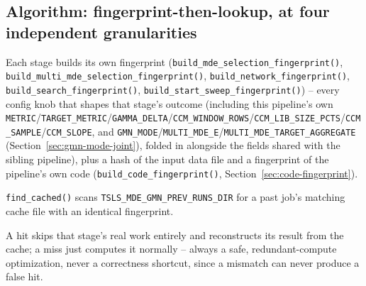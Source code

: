 \documentclass[11pt]{article}
\begin{document}
\subsection{Algorithm: fingerprint-then-lookup, at four independent granularities}
\begin{steps}
\item Each stage builds its own fingerprint (\texttt{build\_mde\_selection\_fingerprint()}, \texttt{build\_multi\_mde\_selection\_fingerprint()}, \texttt{build\_network\_fingerprint()}, \texttt{build\_search\_fingerprint()}, \texttt{build\_start\_sweep\_fingerprint()}) -- every config knob that shapes that stage's outcome (including this pipeline's own \texttt{METRIC}/\texttt{TARGET\_METRIC}/\texttt{GAMMA\_DELTA}/\texttt{CCM\_WINDOW\_ROWS}/\texttt{CCM\_LIB\_SIZE\_PCTS}/\texttt{CCM\_SAMPLE}/\texttt{CCM\_SLOPE}, and \texttt{GMN\_MODE}/\texttt{MULTI\_MDE\_E}/\texttt{MULTI\_MDE\_TARGET\_AGGREGATE} (Section~\ref{sec:gmn-mode-joint}), folded in alongside the fields shared with the sibling pipeline), plus a hash of the input data file and a fingerprint of the pipeline's own code (\texttt{build\_code\_fingerprint()}, Section~\ref{sec:code-fingerprint}).
\item \texttt{find\_cached()} scans \texttt{TSLS\_MDE\_GMN\_PREV\_RUNS\_DIR} for a past job's matching cache file with an identical fingerprint.
\item A hit skips that stage's real work entirely and reconstructs its result from the cache; a miss just computes it normally -- always a safe, redundant-compute optimization, never a correctness shortcut, since a mismatch can never produce a false hit.
\end{steps}
\end{document}
